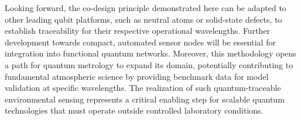\documentclass[aip,reprint,groupedaddress,onecolumn,superscriptaddress]{revtex4-2}
\begin{document}
Looking forward, the co-design principle demonstrated here can be adapted to other leading qubit platforms, such as neutral atoms or solid-state defects, to establish traceability for their respective operational wavelengths. Further development towards compact, automated sensor nodes will be essential for integration into functional quantum networks. Moreover, this methodology opens a path for quantum metrology to expand its domain, potentially contributing to fundamental atmospheric science by providing benchmark data for model validation at specific wavelengths. The realization of such quantum-traceable environmental sensing represents a critical enabling step for scalable quantum technologies that must operate outside controlled laboratory conditions.


\end{document}

